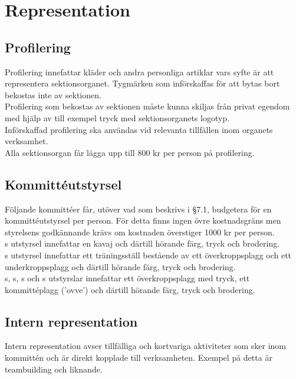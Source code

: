 \documentclass[11pt, includeaddress]{classes/cthit}
\begin{document}
\section{Representation}

\subsection{Profilering}
Profilering innefattar kläder och andra personliga artiklar vars syfte är att representera sektionsorganet. 
Tygmärken som införskaffas för att bytas bort bekostas inte av sektionen. \\

Profilering som bekostas av sektionen måste kunna skiljas från privat egendom med hjälp av till exempel tryck med sektionsorganets logotyp. \\

Införskaffad profilering ska användas vid relevanta tillfällen inom organets verksamhet. \\

Alla sektionsorgan får lägga upp till 800 kr per person på profilering.

\subsection{Kommittéutstyrsel}
Följande kommittéer får, utöver vad som beskrivs i §7.1, budgetera för en kommittéutstyrsel per person. 
För detta finns ingen övre kostnadsgräns men styrelsens godkännande krävs om kostnaden överstiger 1000 kr per person. \\

\ARMIT{}s utstyrsel innefattar en kavaj och därtill hörande färg, tryck och brodering. \\

\FRITID{}s utstyrsel innefattar ett träningsställ bestående av ett överkroppsplagg och ett underkroppsplagg och därtill hörande färg, tryck och brodering. \\

\FLASHIT{}s, \NOLLKIT{}s, \PRIT{}s och \SEXIT{}s utstyrslar innefattar ett överkroppsplagg med tryck, ett kommittéplagg (’ovve’) och därtill hörande färg, tryck och brodering.

\subsection{Intern representation}
Intern representation avser tillfälliga och kortvariga aktiviteter som sker inom kommittén och är direkt kopplade till verksamheten. Exempel på detta är teambuilding och liknande. \\
\end{document}
